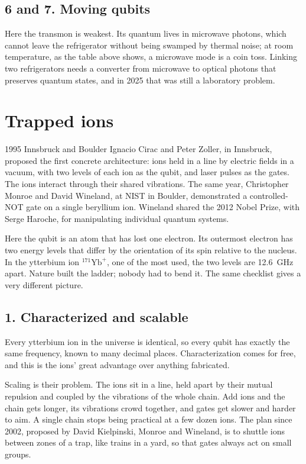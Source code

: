 \subsection*{6 and 7. Moving qubits}

Here the transmon is weakest. Its quantum lives in microwave photons, which cannot leave
the refrigerator without being swamped by thermal noise; at room temperature, as the
table above shows, a microwave mode is a coin toss. Linking two refrigerators needs a
converter from microwave to optical photons that preserves quantum states, and in 2025
that was still a laboratory problem.

\section{Trapped ions}

\begin{history}{1995 \textperiodcentered{} Innsbruck and Boulder}
Ignacio Cirac and Peter Zoller, in Innsbruck, proposed the first concrete architecture:
ions held in a line by electric fields in a vacuum, with two levels of each ion as the
qubit, and laser pulses as the gates. The ions interact through their shared vibrations.
The same year, Christopher Monroe and David Wineland, at NIST in Boulder, demonstrated a
controlled-NOT gate on a single beryllium ion. Wineland shared the 2012 Nobel Prize, with
Serge Haroche, for manipulating individual quantum systems.
\end{history}

Here the qubit is an atom that has lost one electron. Its outermost electron has two
energy levels that differ by the orientation of its spin relative to the nucleus. In the
ytterbium ion $^{171}\mathrm{Yb}^+$, one of the most used, the two levels are 12.6~GHz
apart. Nature built the ladder; nobody had to bend it. The same checklist gives a very
different picture.

\subsection*{1. Characterized and scalable}

Every ytterbium ion in the universe is identical, so every qubit has exactly the same
frequency, known to many decimal places. Characterization comes for free, and this is the
ions' great advantage over anything fabricated.

Scaling is their problem. The ions sit in a line, held apart by their mutual repulsion and
coupled by the vibrations of the whole chain. Add ions and the chain gets longer, its
vibrations crowd together, and gates get slower and harder to aim. A single chain stops
being practical at a few dozen ions. The plan since 2002, proposed by David Kielpinski,
Monroe and Wineland, is to shuttle ions between zones of a trap, like trains in a yard, so
that gates always act on small groups.

